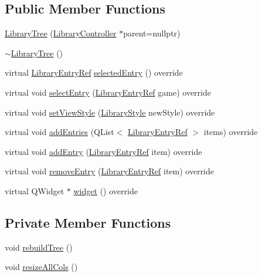 \subsection*{Public Member Functions}
\begin{DoxyCompactItemize}
\item 
\mbox{\hyperlink{class_q_g_b_a_1_1_library_tree_ab324783bd6c3065885562d6fa5d72113}{Library\+Tree}} (\mbox{\hyperlink{class_q_g_b_a_1_1_library_controller}{Library\+Controller}} $\ast$parent=nullptr)
\item 
\mbox{\hyperlink{class_q_g_b_a_1_1_library_tree_a49d53a1e667fc18e9020f663f1801e37}{$\sim$\+Library\+Tree}} ()
\item 
virtual \mbox{\hyperlink{namespace_q_g_b_a_a201fa9f2cb8f778666a134ba81909358}{Library\+Entry\+Ref}} \mbox{\hyperlink{class_q_g_b_a_1_1_library_tree_a4066e38c1708df9e31f451c78c3905bc}{selected\+Entry}} () override
\item 
virtual void \mbox{\hyperlink{class_q_g_b_a_1_1_library_tree_a6d3e6a1d0b807bd7765e2b02e7a86d68}{select\+Entry}} (\mbox{\hyperlink{namespace_q_g_b_a_a201fa9f2cb8f778666a134ba81909358}{Library\+Entry\+Ref}} game) override
\item 
virtual void \mbox{\hyperlink{class_q_g_b_a_1_1_library_tree_a2782544a4651fbf6529cd495ec980d9a}{set\+View\+Style}} (\mbox{\hyperlink{namespace_q_g_b_a_a4804d48d02699a2c1d2436e9269a8bb8}{Library\+Style}} new\+Style) override
\item 
virtual void \mbox{\hyperlink{class_q_g_b_a_1_1_library_tree_ad824322266cad285b9195ca1314b67b1}{add\+Entries}} (Q\+List$<$ \mbox{\hyperlink{namespace_q_g_b_a_a201fa9f2cb8f778666a134ba81909358}{Library\+Entry\+Ref}} $>$ items) override
\item 
virtual void \mbox{\hyperlink{class_q_g_b_a_1_1_library_tree_a36da639f0d8de0811da90f337ee403bd}{add\+Entry}} (\mbox{\hyperlink{namespace_q_g_b_a_a201fa9f2cb8f778666a134ba81909358}{Library\+Entry\+Ref}} item) override
\item 
virtual void \mbox{\hyperlink{class_q_g_b_a_1_1_library_tree_a0464c26602fd0ad56c418d888a9b12b9}{remove\+Entry}} (\mbox{\hyperlink{namespace_q_g_b_a_a201fa9f2cb8f778666a134ba81909358}{Library\+Entry\+Ref}} item) override
\item 
virtual Q\+Widget $\ast$ \mbox{\hyperlink{class_q_g_b_a_1_1_library_tree_ad626b8a7235cd5e88876391a85d0ca3f}{widget}} () override
\end{DoxyCompactItemize}
\subsection*{Private Member Functions}
\begin{DoxyCompactItemize}
\item 
void \mbox{\hyperlink{class_q_g_b_a_1_1_library_tree_a883554c1ef63b3de33d2f609eb743893}{rebuild\+Tree}} ()
\item 
void \mbox{\hyperlink{class_q_g_b_a_1_1_library_tree_a39b86cb11db4ee69205791df77606597}{resize\+All\+Cols}} ()
\end{DoxyCompactItemize}
